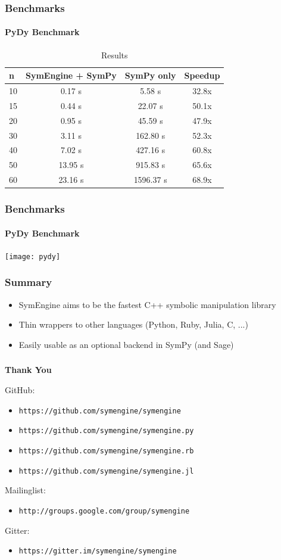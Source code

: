 \documentclass{beamer}
\begin{document}
\begin{frame}
\frametitle{Benchmarks}
\framesubtitle{PyDy Benchmark}
\begin{table}
\begin{tabular}{l | c | c | c  }
n & SymEngine + SymPy & SymPy only & Speedup\\
\hline \hline
10 & 0.17 s & 5.58 s & 32.8x \\
15 & 0.44 s & 22.07 s & 50.1x \\
20 & 0.95 s & 45.59 s & 47.9x \\
30 & 3.11 s & 162.80 s & 52.3x \\
40 & 7.02 s & 427.16 s & 60.8x \\
50 & 13.95 s & 915.83 s & 65.6x \\
60 & 23.16 s & 1596.37 s & 68.9x
\end{tabular}
\caption{Results}
\end{table}
\end{frame}


\begin{frame}
\frametitle{Benchmarks}
\framesubtitle{PyDy Benchmark}
\texttt{[image: pydy]}
\end{frame}


\begin{frame}
\frametitle{Summary}
\begin{itemize}
 \item SymEngine aims to be the fastest C++ symbolic manipulation library
 \item Thin wrappers to other languages (Python, Ruby, Julia, C, ...)
 \item Easily usable as an optional backend in SymPy (and Sage)
\end{itemize}
\end{frame}


\begin{frame}
\frametitle{}
{\Large\bf Thank You}
\medskip

GitHub:
\begin{itemize}
\item \texttt{https://github.com/symengine/symengine}
\item \texttt{https://github.com/symengine/symengine.py}
\item \texttt{https://github.com/symengine/symengine.rb}
\item \texttt{https://github.com/symengine/symengine.jl}
\end{itemize}
Mailinglist:
\begin{itemize}
\item \texttt{http://groups.google.com/group/symengine}
\end{itemize}
Gitter:
\begin{itemize}
\item \texttt{https://gitter.im/symengine/symengine}
\end{itemize}
\end{frame}
\end{document}
